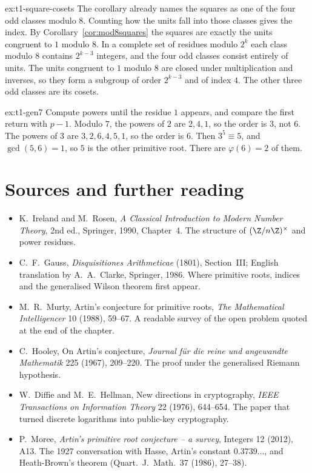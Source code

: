 \begin{solution}{ex:t1-square-cosets}
\idea The corollary already names the squares as one of the four odd classes modulo $8$. Counting how the units fall into those classes gives the index.
\writeup By Corollary~\ref{cor:mod8squares} the squares are exactly the units congruent to $1$ modulo $8$. In a complete set of residues modulo $2^k$ each class modulo $8$ contains $2^{k-3}$ integers, and the four odd classes consist entirely of units. The units congruent to $1$ modulo $8$ are closed under multiplication and inverses, so they form a subgroup of order $2^{k-3}$ and of index $4$. The other three odd classes are its cosets.
\end{solution}

\begin{solution}{ex:t1-gen7}
\idea Compute powers until the residue $1$ appears, and compare the first return with $p-1$.
\writeup Modulo $7$, the powers of $2$ are $2,4,1$, so the order is $3$, not $6$. The powers of $3$ are $3,2,6,4,5,1$, so the order is $6$. Then $3^5\equiv 5$, and $\gcd(5,6)=1$, so $5$ is the other primitive root. There are $\varphi(6)=2$ of them.
\end{solution}

\section*{Sources and further reading}

\begin{itemize}
\item K.~Ireland and M.~Rosen, \emph{A Classical Introduction to Modern Number Theory}, 2nd ed., Springer, 1990, Chapter~4. The structure of $(\Z/n\Z)^\times$ and power residues.
\item C.~F.~Gauss, \emph{Disquisitiones Arithmeticae} (1801), Section~III; English translation by A.~A.~Clarke, Springer, 1986. Where primitive roots, indices and the generalised Wilson theorem first appear.
\item M.~R.~Murty, Artin's conjecture for primitive roots, \emph{The Mathematical Intelligencer} 10 (1988), 59--67. A readable survey of the open problem quoted at the end of the chapter.
\item C.~Hooley, On Artin's conjecture, \emph{Journal f\"ur die reine und angewandte Mathematik} 225 (1967), 209--220. The proof under the generalised Riemann hypothesis.
\item W.~Diffie and M.~E.~Hellman, New directions in cryptography, \emph{IEEE Transactions on Information Theory} 22 (1976), 644--654. The paper that turned discrete logarithms into public-key cryptography.
\item P.~Moree, \emph{Artin's primitive root conjecture -- a survey}, Integers 12 (2012), A13. The 1927 conversation with Hasse, Artin's constant $0.3739\ldots$, and Heath-Brown's theorem (Quart.\ J.\ Math.\ 37 (1986), 27--38).
\end{itemize}
